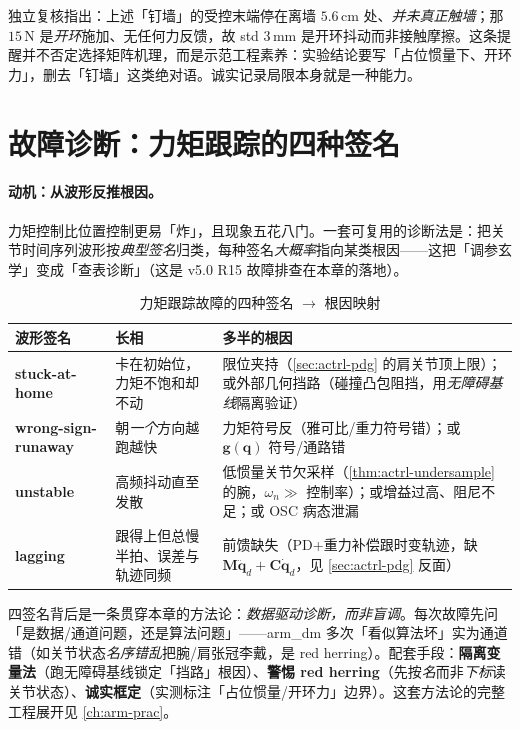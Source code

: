 \begin{note}
独立复核指出：上述「钉墙」的受控末端停在离墙 $5.6\,\mathrm{cm}$ 处、\emph{并未真正触墙}；那 $15\,\mathrm{N}$ 是\emph{开环}施加、无任何力反馈，故 std $3\,\mathrm{mm}$ 是开环抖动而非接触摩擦。这条提醒并不否定选择矩阵机理，而是示范工程素养：实验结论要写「占位惯量下、开环力」，删去「钉墙」这类绝对语。诚实记录局限本身就是一种能力。
\end{note}

\section{故障诊断：力矩跟踪的四种签名}
\label{sec:actrl-diagnostics}

\paragraph{动机：从波形反推根因。}
力矩控制比位置控制更易「炸」，且现象五花八门。一套可复用的诊断法是：把关节时间序列波形按\emph{典型签名}归类，每种签名\emph{大概率}指向某类根因——这把「调参玄学」变成「查表诊断」（这是 v5.0 R15 故障排查在本章的落地）。

\begin{table}[H]\centering\small
\caption{力矩跟踪故障的四种签名 $\to$ 根因映射}
\label{tab:actrl-signatures}
\begin{tabularx}{\linewidth}{p{} L L}
\toprule
波形签名 & 长相 & 多半的根因 \\
\midrule
\textbf{stuck-at-home} & 卡在初始位，力矩不饱和却不动 & 限位夹持（\cref{sec:actrl-pdg} 的肩关节顶上限）；或外部几何挡路（碰撞凸包阻挡，用\emph{无障碍基线}隔离验证）\\
\textbf{wrong-sign-runaway} & 朝\emph{一个}方向越跑越快 & 力矩符号反（雅可比/重力符号错）；或 $\mathbf{g}(\mathbf{q})$ 符号/通路错 \\
\textbf{unstable} & 高频抖动直至发散 & 低惯量关节欠采样（\cref{thm:actrl-undersample} 的腕，$\omega_n\gg$ 控制率）；或增益过高、阻尼不足；或 OSC 病态泄漏 \\
\textbf{lagging} & 跟得上但总慢半拍、误差与轨迹同频 & 前馈缺失（PD+重力补偿跟时变轨迹，缺 $\mathbf{M}\ddot{\mathbf{q}}_d+\mathbf{C}\dot{\mathbf{q}}_d$，见 \cref{sec:actrl-pdg} 反面）\\
\bottomrule
\end{tabularx}
\end{table}

\begin{insight}
四签名背后是一条贯穿本章的方法论：\emph{数据驱动诊断，而非盲调}。每次故障先问「是数据/通道问题，还是算法问题」——arm\_dm 多次「看似算法坏」实为通道错（如关节状态\emph{名序错乱}把腕/肩张冠李戴，是 red herring）。配套手段：\textbf{隔离变量法}（跑无障碍基线锁定「挡路」根因）、\textbf{警惕 red herring}（先按\emph{名}而非\emph{下标}读关节状态）、\textbf{诚实框定}（实测标注「占位惯量/开环力」边界）。这套方法论的完整工程展开见 \cref{ch:arm-prac}。
\end{insight}

